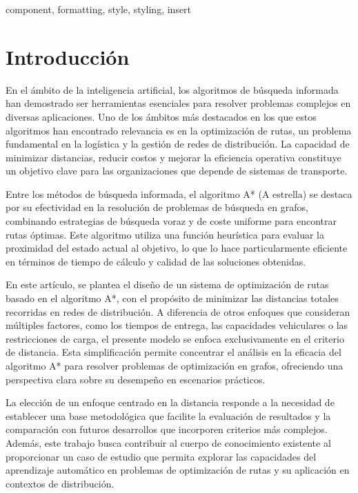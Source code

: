 \documentclass[conference]{IEEEtran}
\begin{document}
	\begin{IEEEkeywords}
		component, formatting, style, styling, insert
	\end{IEEEkeywords}
	
	\section{Introducción}
	En el ámbito de la inteligencia artificial, los algoritmos de búsqueda informada han demostrado ser herramientas esenciales para resolver problemas complejos en diversas aplicaciones. Uno de los ámbitos más destacados en los que estos algoritmos han encontrado relevancia es en la optimización de rutas, un problema fundamental en la logística y la gestión de redes de distribución. La capacidad de minimizar distancias, reducir costos y mejorar la eficiencia operativa constituye un objetivo clave para las organizaciones que depende de sistemas de transporte.
	
	Entre los métodos de búsqueda informada, el algoritmo A* (A estrella) se destaca por su efectividad en la resolución de problemas de búsqueda en grafos, combinando estrategias de búsqueda voraz y de coste uniforme para encontrar rutas óptimas. Este algoritmo utiliza una función heurística para evaluar la proximidad del estado actual al objetivo, lo que lo hace particularmente eficiente en términos de tiempo de cálculo y calidad de las soluciones obtenidas.
	
	En este artículo, se plantea el diseño de un sistema de optimización de rutas basado en el algoritmo A*, con el propósito de minimizar las distancias totales recorridas en redes de distribución. A diferencia de otros enfoques que consideran múltiples factores, como los tiempos de entrega, las capacidades vehiculares o las restricciones de carga, el presente modelo se enfoca exclusivamente en el criterio de distancia. Esta simplificación permite concentrar el análisis en la eficacia del algoritmo A* para resolver problemas de optimización en grafos, ofreciendo una perspectiva clara sobre su desempeño en escenarios prácticos.
	
	La elección de un enfoque centrado en la distancia responde a la necesidad de establecer una base metodológica que facilite la evaluación de resultados y la comparación con futuros desarrollos que incorporen criterios más complejos. Además, este trabajo busca contribuir al cuerpo de conocimiento existente al proporcionar un caso de estudio que permita explorar las capacidades del aprendizaje automático en problemas de optimización de rutas y su aplicación en contextos de distribución.
	
\end{document}
